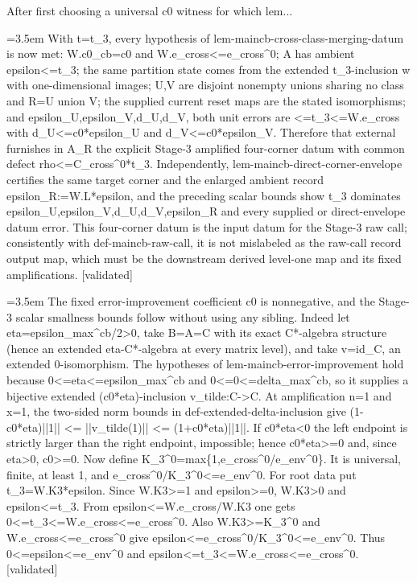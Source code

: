 \documentclass{article}
\newcommand{\step}[1]{\par\noindent\hangindent=3.5em\hangafter=1%
  \makebox[3.5em][l]{\textbf{#1.}}}
\newcommand{\steptag}[1]{\hfill{\small\textsf{[#1]}}}
\begin{document}
\begin{proofbox}{After first choosing a universal c0 witness for which lem...}
\step{1.6} With t=t\_3, every hypothesis of lem-maincb-cross-class-merging-datum is now met: W.c0\_cb=c0 and W.e\_cross<=e\_cross\textasciicircum{}0; A has ambient epsilon<=t\_3; the same partition state comes from the extended t\_3-inclusion w with one-dimensional images; U,V are disjoint nonempty unions sharing no class and R=U union V; the supplied current reset maps are the stated isomorphisms; and epsilon\_U,epsilon\_V,d\_U,d\_V, both unit errors are <=t\_3<=W.e\_cross with d\_U<=c0*epsilon\_U and d\_V<=c0*epsilon\_V. Therefore that external furnishes in A\_R the explicit Stage-3 amplified four-corner datum with common defect rho<=C\_cross\textasciicircum{}0*t\_3. Independently, lem-maincb-direct-corner-envelope certifies the same target corner and the enlarged ambient record epsilon\_R:=W.L*epsilon, and the preceding scalar bounds show t\_3 dominates epsilon\_U,epsilon\_V,d\_U,d\_V,epsilon\_R and every supplied or direct-envelope datum error. This four-corner datum is the input datum for the Stage-3 raw call; consistently with def-maincb-raw-call, it is not mislabeled as the raw-call record output map, which must be the downstream derived level-one map and its fixed amplifications. \steptag{validated} \\[6pt]
\step{1.6.1} The fixed error-improvement coefficient c0 is nonnegative, and the Stage-3 scalar smallness bounds follow without using any sibling. Indeed let eta=epsilon\_max\textasciicircum{}cb/2>0, take B=A=C with its exact C*-algebra structure (hence an extended eta-C*-algebra at every matrix level), and take v=id\_C, an extended 0-isomorphism. The hypotheses of lem-maincb-error-improvement hold because 0<=eta<=epsilon\_max\textasciicircum{}cb and 0<=0<=delta\_max\textasciicircum{}cb, so it supplies a bijective extended (c0*eta)-inclusion v\_tilde:C->C. At amplification n=1 and x=1, the two-sided norm bounds in def-extended-delta-inclusion give (1-c0*eta)||1|| <= ||v\_tilde(1)|| <= (1+c0*eta)||1||. If c0*eta<0 the left endpoint is strictly larger than the right endpoint, impossible; hence c0*eta>=0 and, since eta>0, c0>=0. Now define K\_3\textasciicircum{}0=max\{1,e\_cross\textasciicircum{}0/e\_env\textasciicircum{}0\}. It is universal, finite, at least 1, and e\_cross\textasciicircum{}0/K\_3\textasciicircum{}0<=e\_env\textasciicircum{}0. For root data put t\_3=W.K3*epsilon. Since W.K3>=1 and epsilon>=0, W.K3>0 and epsilon<=t\_3. From epsilon<=W.e\_cross/W.K3 one gets 0<=t\_3<=W.e\_cross<=e\_cross\textasciicircum{}0. Also W.K3>=K\_3\textasciicircum{}0 and W.e\_cross<=e\_cross\textasciicircum{}0 give epsilon<=e\_cross\textasciicircum{}0/K\_3\textasciicircum{}0<=e\_env\textasciicircum{}0. Thus 0<=epsilon<=e\_env\textasciicircum{}0 and epsilon<=t\_3<=W.e\_cross<=e\_cross\textasciicircum{}0. \steptag{validated} \\[4pt]

\end{proofbox}
\end{document}
